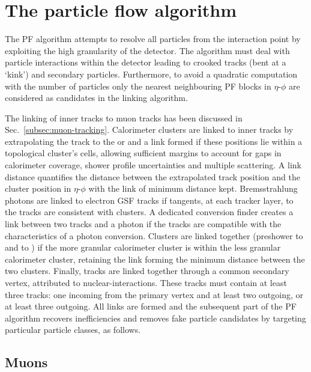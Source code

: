 \section{The particle flow algorithm}

The PF algorithm attempts to resolve all particles from the interaction point
by exploiting the high granularity of the \CMS detector. The algorithm must
deal with particle interactions within the detector leading to crooked tracks
(bent at a `kink') and secondary particles. Furthermore, to avoid a quadratic
computation with the number of particles only the nearest neighbouring PF
blocks in $\eta$-$\phi$ are considered as candidates in the linking algorithm.

The linking of inner tracks to muon tracks has been discussed in
{Sec.~\ref{subsec:muon-tracking}}. Calorimeter clusters are linked to inner
tracks by extrapolating the track to the \ECAL or \HCAL and a link formed if
these positions lie within a topological cluster's cells, allowing sufficient
margins to account for gaps in calorimeter coverage, shower profile
uncertainties and multiple scattering. A link distance quantifies the distance
between the extrapolated track position and the cluster position in
$\eta$-$\phi$ with the link of minimum distance kept. Bremsstrahlung photons
are linked to electron GSF tracks if tangents, at each tracker layer, to the
tracks are consistent with \ECAL clusters. A dedicated conversion finder
creates a link between two tracks and a photon if the tracks are compatible
with the characteristics of a photon conversion. Clusters are linked together
(preshower to \ECAL and \ECAL to \HCAL) if the more granular calorimeter
cluster is within the less granular calorimeter cluster, retaining the link
forming the minimum distance between the two clusters. Finally, tracks are
linked together through a common secondary vertex, attributed to
nuclear-interactions. These tracks must contain at least three tracks: one
incoming from the primary vertex and at least two outgoing, or at least three
outgoing. All links are formed and the subsequent part of the PF algorithm
recovers inefficiencies and removes fake particle candidates by targeting
particular particle classes, as follows.

    
\subsection{Muons}


